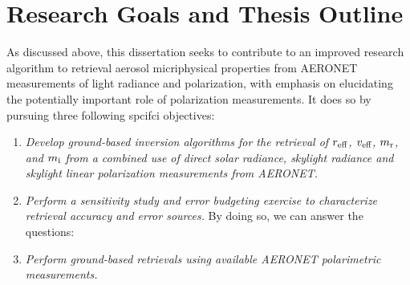 \section{Research Goals and Thesis Outline}

As discussed above, this dissertation seeks to contribute to an improved
research algorithm to retrieval aerosol micriphysical properties from AERONET
measurements of light radiance and polarization, with emphasis on elucidating
the potentially important role of polarization measurements. It does so by 
pursuing three following spcifci objectives:

\begin{enumerate}
\item \textit{Develop ground-based inversion algorithms for the retrieval of $r_\text{eff}$,
$v_\text{eff}$, $m_\text{r}$, and $m_\text{i}$ from a combined use of direct solar radiance, 
skylight radiance and skylight linear polarization measurements from AERONET.}
\item \textit{Perform a sensitivity study and error budgeting exercise to
characterize retrieval accuracy and error sources.} \newline By doing so, we
can answer the questions: 
\item \textit{Perform ground-based retrievals using available AERONET
polarimetric measurements.}
\end{enumerate}

